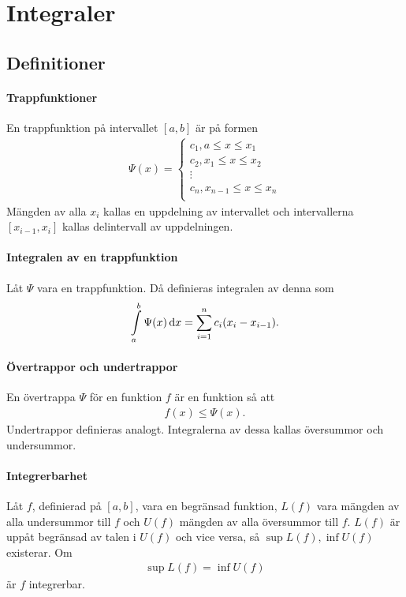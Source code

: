 \section{Integraler}

\subsection{Definitioner}

\paragraph{Trappfunktioner}
En trappfunktion på intervallet $[a, b]$ är på formen
\begin{align*}
	\Psi(x) =
	\begin{cases}
		c_1, a\leq x\leq x_1 \\
		c_2, x_1\leq x\leq x_2 \\
		\vdots \\
		c_n, x_{n - 1}\leq x\leq x_n \\
	\end{cases}
\end{align*}
Mängden av alla $x_i$ kallas en uppdelning av intervallet och intervallerna $[x_{i - 1}, x_i]$ kallas delintervall av uppdelningen.

\paragraph{Integralen av en trappfunktion}
Låt $\Psi$ vara en trappfunktion. Då definieras integralen av denna som
\begin{align*}
	\int\limits_{a}^{b}\Psi(x)\dd{x} = \sum\limits_{i = 1}^{n}c_i(x_i - x_{i - 1}).
\end{align*}

\paragraph{Övertrappor och undertrappor}
En övertrappa $\Psi$ för en funktion $f$ är en funktion så att
\begin{align*}
	f(x)\leq \Psi(x).
\end{align*}
Undertrappor definieras analogt. Integralerna av dessa kallas översummor och undersummor.

\paragraph{Integrerbarhet}
Låt $f$, definierad på $[a, b]$, vara en begränsad funktion, $L(f)$ vara mängden av alla undersummor till $f$ och $U(f)$ mängden av alla översummor till $f$. $L(f)$ är uppåt begränsad av talen i $U(f)$ och vice versa, så $\sup{L(f)}, \inf{U(f)}$ existerar. Om
\begin{align*}
	\sup{L(f)} = \inf{U(f)}
\end{align*}
är $f$ integrerbar.

